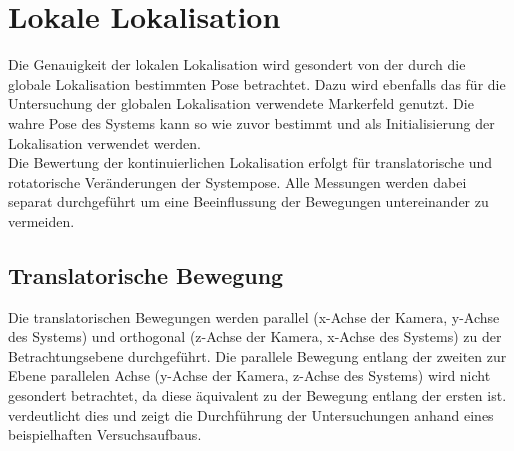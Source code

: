 










\section{Lokale Lokalisation}%
Die Genauigkeit der lokalen Lokalisation wird gesondert von der durch die globale Lokalisation bestimmten Pose betrachtet. Dazu wird ebenfalls das für die Untersuchung der globalen Lokalisation verwendete Markerfeld genutzt. Die wahre Pose des Systems kann so wie zuvor bestimmt und als Initialisierung der Lokalisation verwendet werden.\\

Die Bewertung der kontinuierlichen Lokalisation erfolgt für translatorische und rotatorische Veränderungen der Systempose. Alle Messungen werden dabei separat durchgeführt um eine Beeinflussung der Bewegungen untereinander zu vermeiden.\\

\subsection{Translatorische Bewegung}
Die translatorischen Bewegungen werden parallel (x-Achse der Kamera, y-Achse des Systems) und orthogonal (z-Achse der Kamera, x-Achse des Systems) zu der Betrachtungsebene durchgeführt. Die parallele Bewegung entlang der zweiten zur Ebene parallelen Achse (y-Achse der Kamera, z-Achse des Systems) wird nicht gesondert betrachtet, da diese äquivalent zu der Bewegung entlang der ersten ist.  verdeutlicht dies und zeigt die Durchführung der Untersuchungen anhand eines beispielhaften Versuchsaufbaus.\\

